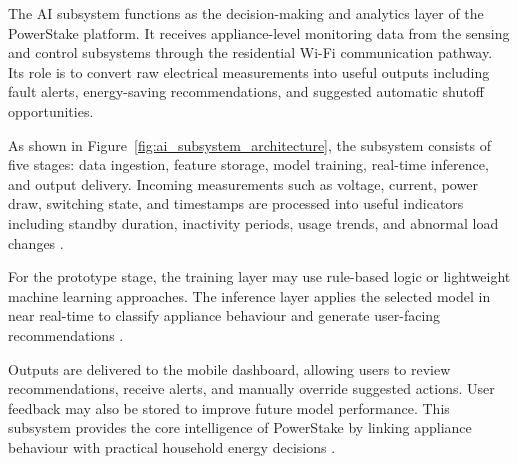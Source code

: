 \documentclass[11pt, twoside, a4paper]{article}
\begin{document}
The AI subsystem functions as the decision-making and analytics layer of the PowerStake platform. It receives appliance-level monitoring data from the 
sensing and control subsystems through the residential Wi-Fi communication pathway. Its role is to convert raw electrical measurements into useful outputs 
including fault alerts, energy-saving recommendations, and suggested automatic shutoff opportunities.

As shown in Figure~\ref{fig:ai_subsystem_architecture}, the subsystem consists of five stages: data ingestion, feature storage, model training, real-time inference, 
and output delivery. Incoming measurements such as voltage, current, power draw, switching state, and timestamps are processed into useful indicators including standby 
duration, inactivity periods, usage trends, and abnormal load changes \cite{Systemdesignhandbook}.

For the prototype stage, the training layer may use rule-based logic or lightweight machine learning approaches. The inference layer applies the selected model in near 
real-time to classify appliance behaviour and generate user-facing recommendations \cite{tensorflowlite}.

Outputs are delivered to the mobile dashboard, allowing users to review recommendations, receive alerts, and manually override suggested actions. User feedback may 
also be stored to improve future model performance. This subsystem provides the core intelligence of PowerStake by linking appliance behaviour with practical household 
energy decisions \cite{Systemdesignhandbook}.



\end{document}
